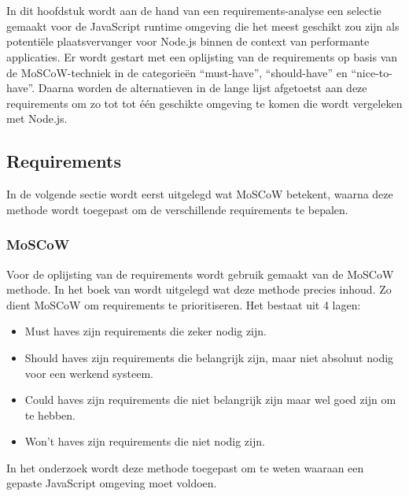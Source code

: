
\chapter{}%
\label{ch:selectie}

In dit hoofdstuk wordt aan de hand van een requirements-analyse een selectie gemaakt voor de JavaScript runtime omgeving 
die het meest geschikt zou zijn als potentiële plaatsvervanger voor Node.js binnen de context van performante applicaties.
Er wordt gestart met een oplijsting van de requirements op basis van de MoSCoW-techniek in de categorieën “must-have”, “should-have” en “nice-to-have”. 
Daarna worden de alternatieven in de lange lijst afgetoetst aan deze requirements om zo tot tot één geschikte omgeving te komen die wordt vergeleken met Node.js.

\section*{Requirements}
In de volgende sectie wordt eerst uitgelegd wat MoSCoW betekent, 
waarna deze methode wordt toegepast om de verschillende requirements te bepalen.
\subsection{MoSCoW}
Voor de oplijsting van de requirements wordt gebruik gemaakt van de MoSCoW methode. 
In het boek van \textcite{Vliet2007} wordt uitgelegd wat deze methode precies inhoud. 
Zo dient MoSCoW om requirements te prioritiseren. Het bestaat uit 4 lagen:
\begin{itemize}
    \item Must haves zijn requirements die zeker nodig zijn.
    \item Should haves zijn requirements die belangrijk zijn, maar niet absoluut nodig voor een werkend systeem.
    \item Could haves zijn requirements die niet belangrijk zijn maar wel goed zijn om te hebben.
    \item Won't haves zijn requirements die niet nodig zijn.
\end{itemize}
In het onderzoek wordt deze methode toegepast om te weten waaraan een gepaste JavaScript omgeving moet voldoen.


